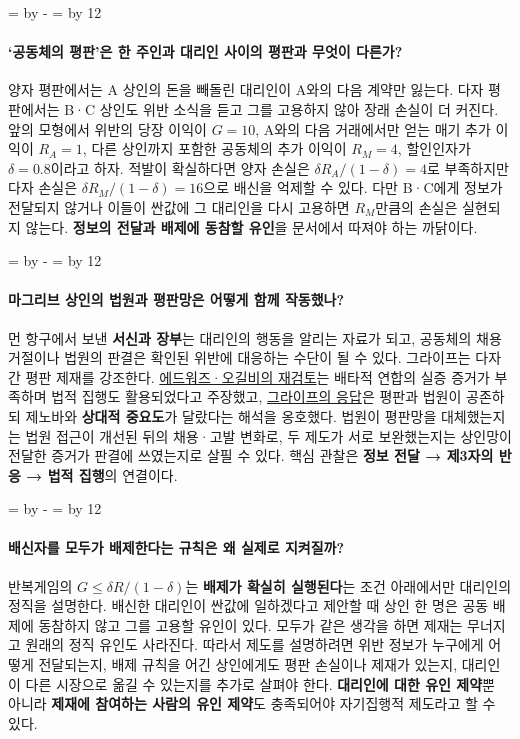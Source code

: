 \documentclass[10pt,a4paper]{article}
\newcommand{\ReserveQuestionSpace}{%
  \par\begingroup
  \dimen0=\pagegoal \advance\dimen0 by -\pagetotal
  \dimen2=\baselineskip \multiply\dimen2 by 12
  \ifdim\dimen0<\dimen2 \newpage\fi
  \endgroup}
\begin{document}
\ReserveQuestionSpace
\paragraph{‘공동체의 평판’은 한 주인과 대리인 사이의 평판과 무엇이 다른가?}
양자 평판에서는 A 상인의 돈을 빼돌린 대리인이 A와의 다음 계약만 잃는다. 다자 평판에서는 B·C 상인도 위반 소식을 듣고 그를 고용하지 않아 장래 손실이 더 커진다. 앞의 모형에서 위반의 당장 이익이 $G=10$, A와의 다음 거래에서만 얻는 매기 추가 이익이 $R_A=1$, 다른 상인까지 포함한 공동체의 추가 이익이 $R_M=4$, 할인인자가 $\delta=0.8$이라고 하자. 적발이 확실하다면 양자 손실은 $\delta R_A/(1-\delta)=4$로 부족하지만 다자 손실은 $\delta R_M/(1-\delta)=16$으로 배신을 억제할 수 있다. 다만 B·C에게 정보가 전달되지 않거나 이들이 싼값에 그 대리인을 다시 고용하면 $R_M$만큼의 손실은 실현되지 않는다. \textbf{정보의 전달과 배제에 동참할 유인}을 문서에서 따져야 하는 까닭이다.\par

\ReserveQuestionSpace
\paragraph{마그리브 상인의 법원과 평판망은 어떻게 함께 작동했나?}
먼 항구에서 보낸 \textbf{서신과 장부}는 대리인의 행동을 알리는 자료가 되고, 공동체의 채용 거절이나 법원의 판결은 확인된 위반에 대응하는 수단이 될 수 있다. 그라이프는 다자간 평판 제재를 강조한다. \href{https://onlinelibrary.wiley.com/doi/abs/10.1111/j.1468-0289.2011.00635.x}{에드워즈·오길비의 재검토}는 배타적 연합의 실증 증거가 부족하며 법적 집행도 활용되었다고 주장했고, \href{https://onlinelibrary.wiley.com/doi/10.1111/j.1468-0289.2012.00645.x}{그라이프의 응답}은 평판과 법원이 공존하되 제노바와 \textbf{상대적 중요도}가 달랐다는 해석을 옹호했다. 법원이 평판망을 대체했는지는 법원 접근이 개선된 뒤의 채용·고발 변화로, 두 제도가 서로 보완했는지는 상인망이 전달한 증거가 판결에 쓰였는지로 살필 수 있다. 핵심 관찰은 \textbf{정보 전달 → 제3자의 반응 → 법적 집행}의 연결이다.\par

\ReserveQuestionSpace
\paragraph{배신자를 모두가 배제한다는 규칙은 왜 실제로 지켜질까?}
반복게임의 $G\leq\delta R/(1-\delta)$는 \textbf{배제가 확실히 실행된다}는 조건 아래에서만 대리인의 정직을 설명한다. 배신한 대리인이 싼값에 일하겠다고 제안할 때 상인 한 명은 공동 배제에 동참하지 않고 그를 고용할 유인이 있다. 모두가 같은 생각을 하면 제재는 무너지고 원래의 정직 유인도 사라진다. 따라서 제도를 설명하려면 위반 정보가 누구에게 어떻게 전달되는지, 배제 규칙을 어긴 상인에게도 평판 손실이나 제재가 있는지, 대리인이 다른 시장으로 옮길 수 있는지를 추가로 살펴야 한다. \textbf{대리인에 대한 유인 제약}뿐 아니라 \textbf{제재에 참여하는 사람의 유인 제약}도 충족되어야 자기집행적 제도라고 할 수 있다.\par
\end{document}
